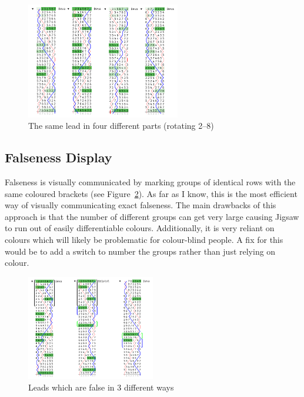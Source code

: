 \documentclass[12pt]{article}
\begin{document}
\begin{figure}
    \centering
    \includegraphics[width=0.6\textwidth]{multi-part-music-clean}
    \caption{The same lead in four different parts (rotating 2--8)}\label{fig:multi-part-music}
\end{figure}

\subsection{Falseness Display}

Falseness is visually communicated by marking groups of identical rows with the same coloured
brackets (see Figure~\ref{fig:falseness}).  As far as I know, this is the most efficient way of
visually communicating exact falseness.  The main drawbacks of this approach is that the number of
different groups can get very large causing Jigsaw to run out of easily differentiable colours.
Additionally, it is very reliant on colours which will likely be problematic for colour-blind
people.  A fix for this would be to add a switch to number the groups rather than just relying on
colour.

\begin{figure}
    \centering
    \includegraphics[width=0.5\textwidth]{falseness-clean}
    \caption{Leads which are false in 3 different ways}\label{fig:falseness}
\end{figure}
\end{document}
